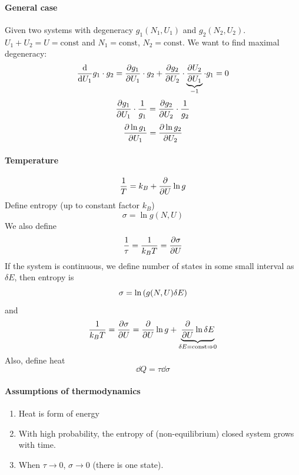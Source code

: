 \paragraph{General case}
Given two systems with degeneracy $g_1(N_1, U_1)$ and $g_2(N_2, U_2)$. $U_1+U_2 = U = \text{const}$ and $N_1=\text{const}$, $N_2=\text{const}$. We want to find maximal degeneracy:
$$\dv{U_1} g_1\cdot g_2 = \pdv{g_1}{U_1 } \cdot g_2 + \pdv{g_2}{U_2} \cdot \underbrace{\pdv{U_2}{U_1}}_{-1} \cdot g_1 = 0$$
$$\pdv{g_1}{U_1 }  \cdot \frac{1}{g_1} = \pdv{g_2}{U_2}  \cdot \frac{1}{g_2}$$
$$\pdv{\ln g_1}{U_1 }  = \pdv{\ln g_2}{U_2} $$
\paragraph{Temperature}
$$\frac{1}{T} = k_B + \pdv{U} \ln g$$
Define entropy (up to constant factor $k_B$)
$$\sigma = \ln g(N,U)$$
We also define
$$\frac{1}{\tau} = \frac{1}{k_B T} = \pdv{\sigma}{U}$$
If the system is continuous, we define number of states in some small interval as $\delta E$, then entropy is
$$\sigma = \ln \qty(g(N,U)\delta E)$$
and
$$\frac{1}{k_B T} = \pdv{\sigma}{U} = \pdv{U} \ln g + \underbrace{\pdv{U} \ln \delta E}_{\delta E = \text{const} \Rightarrow 0}$$
Also, define heat
$$\dd{Q} = \tau \dd{\sigma}$$
\paragraph{Assumptions of thermodynamics}
\begin{enumerate}
	\item Heat is form of energy
	\item With high probability, the entropy of (non-equilibrium) closed system grows with time.
	\item When $\tau \to 0$, $\sigma\to0$ (there is one state).
\end{enumerate}
